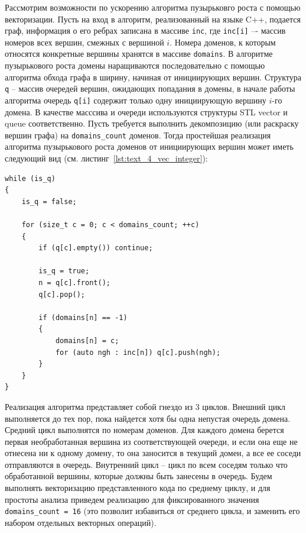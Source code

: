 Рассмотрим возможности по ускорению алгоритма пузырьковго роста с помощью векторизации.
Пусть на вход в алгоритм, реализованный на языке C++, подается граф, информация о его ребрах записана в массиве \texttt{inc}, где \texttt{inc[i]} –- массив номеров всех вершин, смежных с вершиной $i$.
Номера доменов, к которым относятся конкретные вершины хранятся в массиве \texttt{domains}.
В алгоритме пузырькового роста домены наращиваются последовательно с помощью алгоритма обхода графа в ширину, начиная от инициирующих вершин.
Структура \texttt{q} -- массив очередей вершин, ожидающих попадания в домены, в начале работы алгоритма очередь \texttt{q[i]} содержит только одну инициирующую вершину $i$-го домена.
В качестве масссива и очереди используются структуры STL vector и queue соответственно.
Пусть требуется выполнить декомпозицию (или раскраску вершин графа) на \texttt{domains\_count} доменов.
Тогда простейшая реализация алгоритма пузырькового роста доменов от инициирующих вершин может иметь следующий вид (см. листинг~\ref{lst:text_4_vec_integer}):

\begin{lstlisting}[caption={Реализация алгоритма пузырькового роста доменов.},label={lst:text_4_vec_integer}]
while (is_q)
{
    is_q = false;

    for (size_t c = 0; c < domains_count; ++c)
    {
        if (q[c].empty()) continue;

        is_q = true;
        n = q[c].front();
        q[c].pop();

        if (domains[n] == -1)
        {
            domains[n] = c;
            for (auto ngh : inc[n]) q[c].push(ngh);
        }
    }
}
\end{lstlisting}

Реализация алгоритма представляет собой гнездо из 3 циклов.
Внешний цикл выполняется до тех пор, пока найдется хотя бы одна непустая очередь домена.
Средний цикл выполнятся по номерам доменов.
Для каждого домена берется первая необработанная вершина из соответствующей очереди, и если она еще не отнесена ни к одному домену, то она заносится в текущий домен, а все ее соседи отправляются в очередь.
Внутренний цикл -- цикл по всем соседям только что обработанной вершины, которые должны быть занесены в очередь.
Будем выполнять векторизацию представленного кода по среднему циклу, и для простоты анализа приведем реализацию для фиксированного значения \texttt{domains\_count = 16} (это позволит избавиться от среднего цикла, и заменить его набором отдельных векторных операций).

